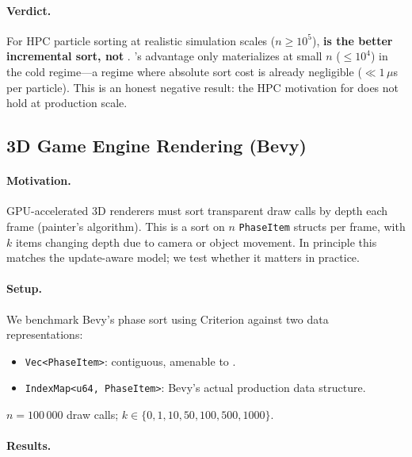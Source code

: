 \paragraph{Verdict.}
For HPC particle sorting at realistic simulation scales ($n \geq 10^5$),
\textbf{\ESM is the better incremental sort, not \DeltaSort}.
\DeltaSort's advantage only materializes at small $n$ ($\leq 10^4$) in the cold
regime---a regime where absolute sort cost is already negligible ($\ll 1\,\mu$s
per particle).
This is an honest negative result: the HPC motivation for \DeltaSort does not
hold at production scale.

\subsection{3D Game Engine Rendering (Bevy)}
\label{sec:bevy}

\paragraph{Motivation.}
GPU-accelerated 3D renderers must sort transparent draw calls by
depth each frame (painter's algorithm).
This is a sort on $n$ \texttt{PhaseItem} structs per frame, with $k$ items
changing depth due to camera or object movement.
In principle this matches the update-aware model; we test whether it matters in practice.

\paragraph{Setup.}
We benchmark Bevy's phase sort using Criterion against two data representations:
\begin{itemize}
  \item \texttt{Vec<PhaseItem>}: contiguous, amenable to \DeltaSort.
  \item \texttt{IndexMap<u64, PhaseItem>}: Bevy's actual production data structure.
\end{itemize}
$n = 100\,000$ draw calls; $k \in \{0, 1, 10, 50, 100, 500, 1000\}$.

\paragraph{Results.}

